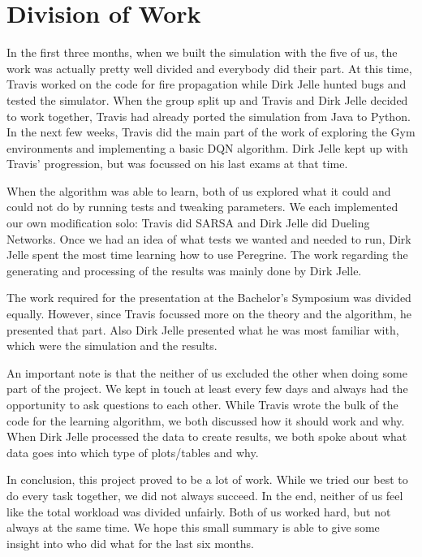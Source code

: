 
\section*{Division of Work}\label{sec:division}

In the first three months, when we built the simulation with the five of us, the work was actually pretty well divided and everybody did their part. At this time, Travis worked on the code for fire propagation while Dirk Jelle hunted bugs and tested the simulator. When the group split up and Travis and Dirk Jelle decided to work together, Travis had already ported the simulation from Java to Python. In the next few weeks, Travis did the main part of the work of exploring the Gym environments and implementing a basic DQN algorithm. Dirk Jelle kept up with Travis' progression, but was focussed on his last exams at that time.

When the algorithm was able to learn, both of us explored what it could and could not do by running tests and tweaking parameters. We each implemented our own modification solo: Travis did SARSA and Dirk Jelle did Dueling Networks. Once we had an idea of what tests we wanted and needed to run, Dirk Jelle spent the most time learning how to use Peregrine. The work regarding the generating and processing of the results was mainly done by Dirk Jelle.

The work required for the presentation at the Bachelor's Symposium was divided equally. However, since Travis focussed more on the theory and the algorithm, he presented that part. Also Dirk Jelle presented what he was most familiar with, which were the simulation and the results.

An important note is that the neither of us excluded the other when doing some part of the project. We kept in touch at least every few days and always had the opportunity to ask questions to each other. While Travis wrote the bulk of the code for the learning algorithm, we both discussed how it should work and why. When Dirk Jelle processed the data to create results, we both spoke about what data goes into which type of plots/tables and why.

In conclusion, this project proved to be a lot of work. While we tried our best to do every task together, we did not always succeed. In the end, neither of us feel like the total workload was divided unfairly. Both of us worked hard, but not always at the same time. We hope this small summary is able to give some insight into who did what for the last six months.
